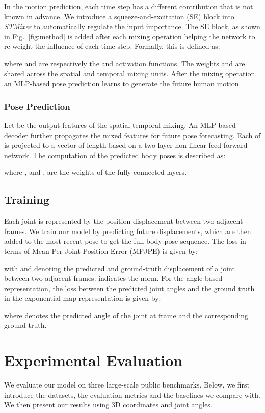 \documentclass{article}
\begin{document}
In the motion prediction, each time step has a different contribution that is not known in advance. We introduce a squeeze-and-excitation (SE) block \cite{hu2018squeeze} into \textit{STMixer} to automatically regulate the input importance. The SE block, as shown in Fig.~\ref{fig:method} is added after each mixing operation helping the network to re-weight the influence of each time step. Formally, this is defined as:

where  and  are respectively the   and  activation functions. The weights  and  are shared across the spatial and temporal mixing units. After the mixing operation, an MLP-based pose prediction learns to generate the future human motion. 

\subsubsection{Pose Prediction}
Let  be the output features of the spatial-temporal mixing. An MLP-based decoder further propagates the mixed features for future pose forecasting. Each  of  is projected to a vector of length  based on a two-layer non-linear feed-forward network. The computation of the predicted body poses  is described as:

where ,  and ,  are the weights of the fully-connected layers. 

\subsection{Training}

 Each joint is represented by the position displacement between two adjacent frames. We train our model by predicting future displacements, which are then added to the most recent pose to get the full-body pose sequence. The loss in terms of Mean Per Joint Position Error (MPJPE) is given by:

with  and  denoting the predicted and ground-truth displacement of a joint  between two adjacent frames.  indicates the  norm. For the angle-based representation, the loss between the predicted joint angles and the ground truth in the exponential map representation   is given by:

where   denotes the predicted angle of the joint  at frame  and  the corresponding ground-truth.  

\section {Experimental Evaluation}
We evaluate our model on three large-scale public benchmarks. Below, we first introduce the datasets, the evaluation metrics and the baselines we compare with. We then present our results using 3D coordinates and joint angles.
\end{document}
